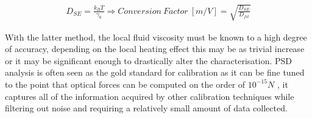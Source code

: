 \begin{align}
	\label{eq:correction_factor}
	D_{SE} = \frac{k_BT}{\gamma_0} \Rightarrow Conversion\ Factor \ [m/V]= \sqrt{\frac{D_{SE}}{D_{fit}}}
\end{align}

With the latter method, the local fluid viscosity must be known to a high degree of accuracy, depending on the local heating effect this may be as trivial increase or it may be significant enough to drastically alter the characterisation. PSD analysis is often seen as the gold standard for calibration as it can be fine tuned to the point that optical forces can be computed on the order of $10^{-15} N$ \cite{BergSoerensen2004}, it captures all of the information acquired by other calibration techniques while filtering out noise and requiring a relatively small amount of data collected. 

